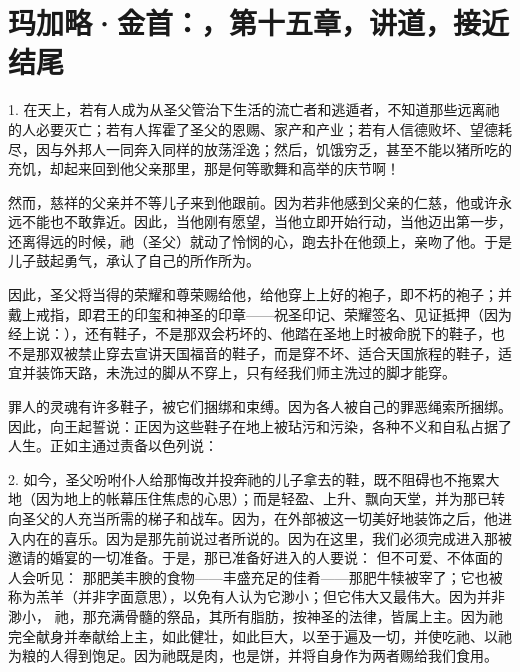 
\section{玛加略·金首：，第十五章，讲道，接近结尾}

1. 在天上，若有人成为从圣父管治下生活的流亡者和逃遁者，不知道那些远离祂的人必要灭亡；若有人挥霍了圣父的恩赐、家产和产业；若有人信德败坏、望德耗尽，因与外邦人一同奔入同样的放荡淫逸；然后，饥饿穷乏，甚至不能以猪所吃的充饥，却起来回到他父亲那里，那是何等歌舞和高举的庆节啊！\par

然而，慈祥的父亲并不等儿子来到他跟前。因为若非他感到父亲的仁慈，他或许永远不能也不敢靠近。因此，当他刚有愿望，当他立即开始行动，当他迈出第一步，还离得远的时候，祂（圣父）就动了怜悯的心，跑去扑在他颈上，亲吻了他。于是儿子鼓起勇气，承认了自己的所作所为。\par

因此，圣父将当得的荣耀和尊荣赐给他，给他穿上上好的袍子，即不朽的袍子；并戴上戒指，即君王的印玺和神圣的印章——祝圣印记、荣耀签名、见证抵押（因为经上说：），还有鞋子，不是那双会朽坏的、他踏在圣地上时被命脱下的鞋子，也不是那双被禁止穿去宣讲天国福音的鞋子，而是穿不坏、适合天国旅程的鞋子，适宜并装饰天路，未洗过的脚从不穿上，只有经我们师主洗过的脚才能穿。\par

罪人的灵魂有许多鞋子，被它们捆绑和束缚。因为各人被自己的罪恶绳索所捆绑。因此，向王起誓说：正因为这些鞋子在地上被玷污和污染，各种不义和自私占据了人生。正如主通过责备以色列说：\par

2. 如今，圣父吩咐仆人给那悔改并投奔祂的儿子拿去的鞋，既不阻碍也不拖累大地（因为地上的帐幕压住焦虑的心思）；而是轻盈、上升、飘向天堂，并为那已转向圣父的人充当所需的梯子和战车。因为，在外部被这一切美好地装饰之后，他进入内在的喜乐。因为是那先前说过者所说的。因为在这里，我们必须完成进入那被邀请的婚宴的一切准备。于是，那已准备好进入的人要说： 但不可爱、不体面的人会听见： 那肥美丰腴的食物——丰盛充足的佳肴——那肥牛犊被宰了；它也被称为羔羊（并非字面意思），以免有人认为它渺小；但它伟大又最伟大。因为并非渺小， 祂，那充满骨髓的祭品，其所有脂肪，按神圣的法律，皆属上主。因为祂完全献身并奉献给上主，如此健壮，如此巨大，以至于遍及一切，并使吃祂、以祂为粮的人得到饱足。因为祂既是肉，也是饼，并将自身作为两者赐给我们食用。\par

